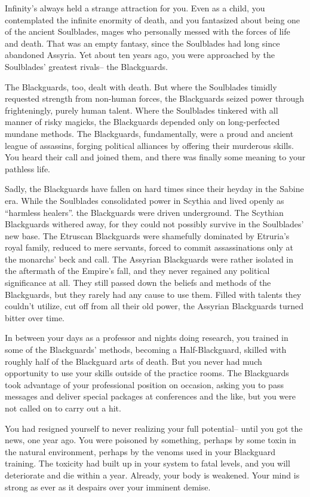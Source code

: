 \documentclass[char]{Kos}
\begin{document}
Infinity's always held a strange attraction for you. Even as a child, you contemplated the infinite enormity of death, and you fantasized about being one of the ancient Soulblades, mages who personally messed with the forces of life and death. That was an empty fantasy, since the Soulblades had long since abandoned Assyria. Yet about ten years ago, you were approached by the Soulblades' greatest rivals-- the Blackguards.

The Blackguards, too, dealt with death. But where the Soulblades timidly requested strength from non-human forces, the Blackguards seized power through frighteningly, purely human talent.  Where the Soulblades tinkered with all manner of risky magicks, the Blackguards depended only on long-perfected mundane methods. The Blackguards, fundamentally, were a proud and ancient league of assassins, forging political alliances by offering their murderous skills. You heard their call and joined them, and there was finally some meaning to your pathless life.

Sadly, the Blackguards have fallen on hard times since their heyday in the Sabine era. While the Soulblades consolidated power in Scythia and lived openly as ``harmless healers''. the Blackguards were driven underground. The Scythian Blackguards withered away, for they could not possibly survive in the Soulblades' new base. The Etruscan Blackguards were shamefully dominated by Etruria's royal family, reduced to mere servants, forced to commit assassinations only at the monarchs' beck and call. The Assyrian Blackguards were rather isolated in the aftermath of the Empire's fall, and they never regained any political significance at all. They still passed down the beliefs and methods of the Blackguards, but they rarely had any cause to use them. Filled with talents they couldn't utilize, cut off from all their old power, the Assyrian Blackguards turned bitter over time.

In between your days as a professor and nights doing research, you trained in some of the Blackguards' methods, becoming a Half-Blackguard, skilled with roughly half of the Blackguard arts of death. But you never had much opportunity to use your skills outside of the practice rooms. The Blackguards took advantage of your professional position on occasion, asking you to pass messages and deliver special packages at conferences and the like, but you were not called on to carry out a hit.

You had resigned yourself to never realizing your full potential-- until you got the news, one year ago. You were poisoned by something, perhaps by some toxin in the natural environment, perhaps by the venoms used in your Blackguard training. The toxicity had built up in your system to fatal levels, and you will deteriorate and die within a year. Already, your body is weakened. Your mind is strong as ever as it despairs over your imminent demise.
\end{document}
